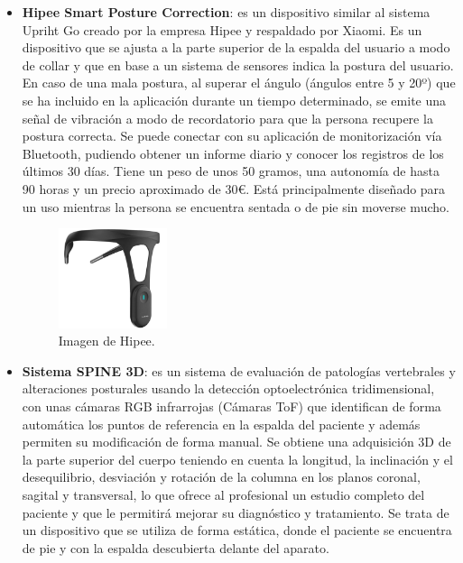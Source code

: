 \begin{itemize}
    \item \textbf{Hipee Smart Posture Correction}\cite{Hipee1,Hipee2}: es un dispositivo similar al sistema Upriht Go creado por la empresa Hipee\cite{HipeeEmp} y respaldado por Xiaomi\cite{Xiaomi}. Es un dispositivo que se ajusta a la parte superior de la espalda del usuario a modo de collar y que en base a un sistema de sensores indica la postura del usuario. En caso de una mala postura, al superar el ángulo (ángulos entre 5 y 20º) que se ha incluido en la aplicación durante un tiempo determinado, se emite una señal de vibración a modo de recordatorio para que la persona recupere la postura correcta. Se puede conectar con su aplicación de monitorización vía Bluetooth, pudiendo obtener un informe diario y conocer los registros de los últimos 30 días. Tiene un peso de unos 50 gramos, una autonomía de hasta 90 horas y un precio aproximado de 30€. Está principalmente diseñado para un uso mientras la persona se encuentra sentada o de pie sin moverse mucho. 
\begin{figure}[h!]
    \centering
    \includegraphics[width=0.3\textwidth]{img/imghipee.jpg}
    \caption{Imagen de Hipee.\cite{Hipee3}}
    \label{fig:imgHipee} 
\end{figure}

    \item \textbf{Sistema SPINE 3D}\cite{SPINE3D}: es un sistema de evaluación de patologías vertebrales y alteraciones posturales usando la detección optoelectrónica tridimensional, con unas cámaras RGB infrarrojas (Cámaras ToF) que identifican de forma automática los puntos de referencia en la espalda del paciente y además permiten su modificación de forma manual. Se obtiene una adquisición 3D de la parte superior del cuerpo teniendo en cuenta la longitud, la inclinación y el desequilibrio, desviación y rotación de la columna en los planos coronal, sagital y transversal, lo que ofrece al profesional un estudio completo del paciente y que le permitirá mejorar su diagnóstico y tratamiento. Se trata de un dispositivo que se utiliza de forma estática, donde el paciente se encuentra de pie y con la espalda descubierta delante del aparato. 


\end{itemize}
